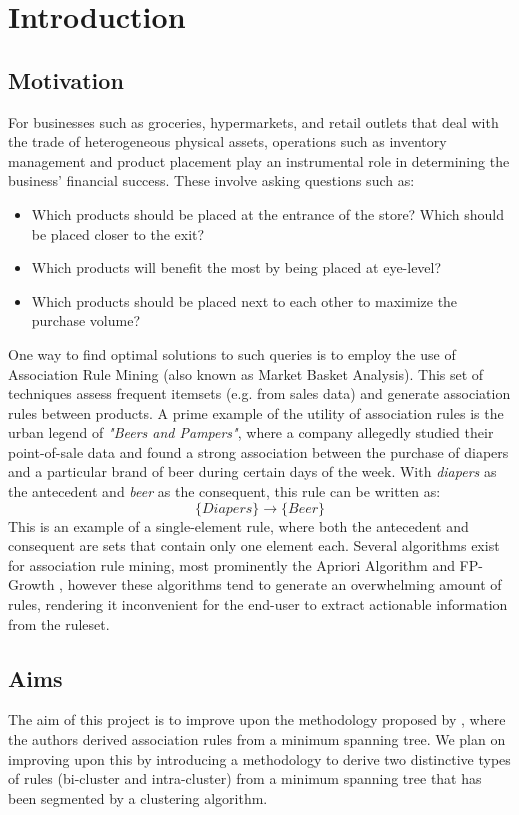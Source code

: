 \chapter{Introduction}


\section{Motivation}
For businesses such as groceries, hypermarkets, and retail outlets that deal with the trade of heterogeneous physical assets, operations such as inventory management and product placement play an instrumental role in determining the business' financial success. These involve asking questions such as:
\begin{itemize}
\item Which products should be placed at the entrance of the store? Which should be placed closer to the exit?
\item Which products will benefit the most by being placed at eye-level?
\item Which products should be placed next to each other to maximize the purchase volume?
\end{itemize}
One way to find optimal solutions to such queries is to employ the use of Association Rule Mining (also known as Market Basket Analysis). This set of techniques assess frequent itemsets (e.g. from sales data) and generate association rules between products. 
A prime example of the utility of association rules is the urban legend of \textit{"Beers and Pampers"}, where a company allegedly studied their point-of-sale data and found a strong association between the purchase of diapers and a particular brand of beer during certain days of the week. With \textit{diapers} as the antecedent and \textit{beer} as the consequent, this rule can be written as:
\[
\{\textit{Diapers}\} \rightarrow \{\textit{Beer}\}
\]
This is an example of a single-element rule, where both the antecedent and consequent are sets that contain only one element each. Several algorithms exist for association rule mining, most prominently the Apriori Algorithm  and FP-Growth , however these algorithms tend to generate an overwhelming amount of rules, rendering it inconvenient for the end-user to extract actionable information from the ruleset.

\section{Aims}
The aim of this project is to improve upon the methodology proposed by , where the authors derived association rules from a minimum spanning tree. We plan on improving upon this by introducing a methodology to derive two distinctive types of rules (bi-cluster and intra-cluster) from a minimum spanning tree that has been segmented by a clustering algorithm.

